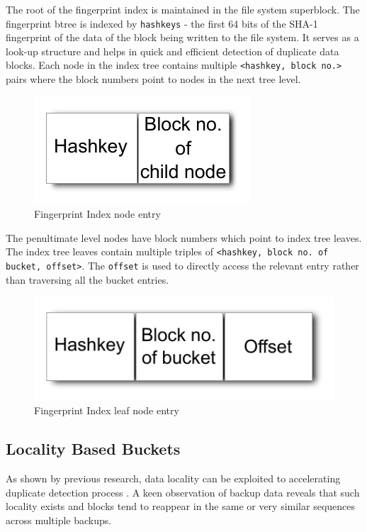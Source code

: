 \documentclass[final]{ols}
\begin{document}
The root of the fingerprint index is maintained in the file system superblock. The fingerprint btree is indexed by \texttt{hashkeys} - the first 64 bits of the SHA-1 fingerprint of the data of the block being written to the file system. It serves as a look-up structure and helps in quick and efficient detection of duplicate data blocks. Each node in the index tree contains multiple \texttt{<hashkey, block no.>} pairs where the block numbers point to nodes in the next tree level. 

\begin{figure}[H]
\begin{center}
\includegraphics[width=0.45\columnwidth]{images/fingerprint_node}
\caption{Fingerprint Index node entry}  
\end{center}
\end{figure}

The penultimate level nodes have block numbers which point to index tree leaves. The index tree leaves contain multiple triples of \texttt{<hashkey, block no. of bucket, offset>}. The \texttt{offset} is used to directly access the relevant entry rather than traversing all the bucket entries.

\begin{figure}[H]
\begin{center}
\includegraphics[width=0.7\columnwidth]{images/fingerprint_leaf}
\caption{Fingerprint Index leaf node entry}  
\end{center}
\end{figure}

\subsection{Locality Based Buckets}
As shown by previous research, data locality can be exploited to accelerating duplicate
detection process \cite{3}. A keen observation of backup data reveals that such locality exists and 
blocks tend to reappear in the same or very similar sequences across multiple backups. 
\end{document}
